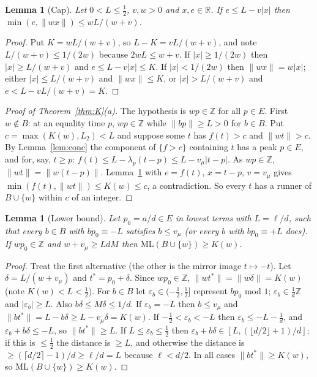 \documentclass[11pt]{article}
\newtheorem{lemma}[theorem]{Lemma}
\theoremstyle{definition}
\theoremstyle{remark}
\newcommand{\nd}[1]{\lVert #1\rVert}
\newcommand{\ML}{\mathrm{ML}}
\newcommand{\ZZ}{\mathbb{Z}}
\newcommand{\RR}{\mathbb{R}}
\begin{document}
\begin{lemma}[Cap]\label{lem:cap}
Let $0<L\le\frac12$, $v,w>0$ and $x,e\in\RR$. If $e\le L-v|x|$ then $\min(e,\nd{wx})\le wL/(w+v)$.
\end{lemma}
\begin{proof}
Put $K=wL/(w+v)$, so $L-K=vL/(w+v)$, and note $L/(w+v)\le1/(2w)$ because $2wL\le w+v$. If $|x|\ge1/(2w)$ then $|x|\ge L/(w+v)$ and $e\le L-v|x|\le K$. If $|x|<1/(2w)$ then $\nd{wx}=w|x|$; either $|x|\le L/(w+v)$ and $\nd{wx}\le K$, or $|x|>L/(w+v)$ and $e<L-vL/(w+v)=K$.
\end{proof}

\begin{proof}[Proof of Theorem~\ref{thm:K}(a)]
The hypothesis is $wp\in\ZZ$ for all $p\in E$. First $w\notin B$: at an equality time $p$, $wp\in\ZZ$ while $\nd{bp}\ge L>0$ for $b\in B$. Put $c=\max(K(w),L_2)<L$ and suppose some $t$ has $f(t)>c$ and $\nd{wt}>c$. By Lemma~\ref{lem:conc} the component of $\{f>c\}$ containing $t$ has a peak $p\in E$, and for, say, $t\ge p$: $f(t)\le L-\lambda_p(t-p)\le L-v_\mu|t-p|$. As $wp\in\ZZ$, $\nd{wt}=\nd{w(t-p)}$. Lemma~\ref{lem:cap} with $e=f(t)$, $x=t-p$, $v=v_\mu$ gives $\min(f(t),\nd{wt})\le K(w)\le c$, a contradiction. So every $t$ has a runner of $B\cup\{w\}$ within $c$ of an integer.
\end{proof}

\begin{lemma}[Lower bound]\label{lem:Klow}
Let $p_0=a/d\in E$ in lowest terms with $L=\ell/d$, such that every $b\in B$ with $bp_0\equiv-L$ satisfies $b\le v_\mu$ (or every $b$ with $bp_0\equiv+L$ does). If $wp_0\in\ZZ$ and $w+v_\mu\ge LdM$ then $\ML(B\cup\{w\})\ge K(w)$.
\end{lemma}
\begin{proof}
Treat the first alternative (the other is the mirror image $t\mapsto-t$). Let $\delta=L/(w+v_\mu)$ and $t^*=p_0+\delta$. Since $wp_0\in\ZZ$, $\nd{wt^*}=\nd{w\delta}=K(w)$ (note $K(w)<L<\frac12$). For $b\in B$ let $\varepsilon_b\in(-\frac12,\frac12]$ represent $bp_0$ mod $1$; $\varepsilon_b\in\frac1d\ZZ$ and $|\varepsilon_b|\ge L$. Also $b\delta\le M\delta\le1/d$. If $\varepsilon_b=-L$ then $b\le v_\mu$ and $\nd{bt^*}=L-b\delta\ge L-v_\mu\delta=K(w)$. If $-\frac12<\varepsilon_b<-L$ then $\varepsilon_b\le-L-\frac1d$, and $\varepsilon_b+b\delta\le-L$, so $\nd{bt^*}\ge L$. If $L\le\varepsilon_b\le\frac12$ then $\varepsilon_b+b\delta\in[L,(\lfloor d/2\rfloor+1)/d]$; if this is $\le\frac12$ the distance is $\ge L$, and otherwise the distance is $\ge(\lceil d/2\rceil-1)/d\ge\ell/d=L$ because $\ell<d/2$. In all cases $\nd{bt^*}\ge K(w)$, so $\ML(B\cup\{w\})\ge K(w)$.
\end{proof}
\end{document}
